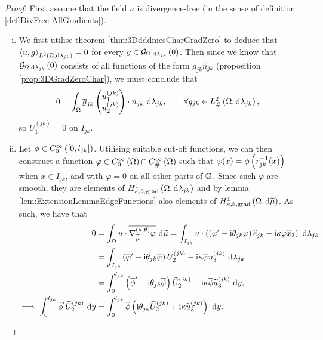 \begin{proof}
	First assume that the field $u$ is divergence-free (in the sense of definition \ref{def:DivFree-AllGradients}).
	\begin{enumerate}[(i)]
		\item We first utilise theorem \ref{thm:3DdddmesCharGradZero} to deduce that $\left\langle u , g \right\rangle_{L^{2}\left( \Omega,\mathrm{d} \lambda_{jk} \right)}=0$ for every $g\in\mathcal{G}_{ \Omega, \mathrm{d}\lambda_{jk}}\left( 0 \right)$.
		Then since we know that $\mathcal{G}_{ \Omega, \mathrm{d}\lambda_{jk}}\left( 0 \right)$ consists of all functions of the form $g_{jk}\hat{n}_{jk}$ (proposition \ref{prop:3DGradZeroChar}), we must conclude that
		\begin{align*}
			0 &= \int_{\Omega} \overline{g}_{jk}\begin{pmatrix} u_1^{(jk)} \\ u_2^{(jk)} \end{pmatrix}\cdot n_{jk}  \ \mathrm{d}\lambda_{jk}, \qquad \forall g_{jk}\in L^2_{\#}\left( \Omega,\mathrm{d} \lambda_{jk} \right),
		\end{align*}
		so $U_1^{(jk)}=0$ on $I_{jk}$.
		\item Let $\phi\in C^{\infty}_{0}\left( \left[ 0,l_{jk} \right] \right)$.
		Utilising suitable cut-off functions, we can then construct a function $\varphi\in C^{\infty}_{0}\left( \Omega \right)\cap C^{\infty}_{\#}\left( \Omega \right)$ such that $\varphi(x)=\phi\left( r_{jk}^{-1}(x) \right)$ when $x\in I_{jk}$, and with $\varphi=0$ on all other parts of $\mathbb{G}$.
		Since such $\varphi$ are smooth, they are elements of $H^1_{\kappa,\theta,\mathrm{grad}}\left( \Omega, \mathrm{d}\lambda_{jk} \right)$ and by lemma \ref{lem:ExtensionLemmaEdgeFunctions} also elements of $H^1_{\kappa,\theta,\mathrm{grad}}\left( \Omega, \mathrm{d}\widetilde{\mu} \right)$.
		As such, we have that
		\begin{align*}
			0 &= \int_{\Omega} u\cdot\overline{\nabla^{\left( \kappa, \theta \right)}_{\widetilde{\mu}}\varphi}  \ \mathrm{d}\widetilde{\mu}
			= \int_{I_{jk}} u\cdot\left(  \left( \overline{\varphi}' - \mathrm{i}\theta_{jk}\overline{\varphi} \right)\widehat{e}_{jk} - \mathrm{i}\kappa\overline{\varphi}\widehat{x}_3 \right)  \ \mathrm{d}\lambda_{jk} \\
			&= \int_{I_{jk}} \left( \overline{\varphi}' - \mathrm{i}\theta_{jk}\overline{\varphi} \right)U_2^{(jk)} - \mathrm{i}\kappa\overline{\varphi}u_3^{(jk)}  \ \mathrm{d}\lambda_{jk} \\
			&= \int_0^{l_{jk}} \left( \overline{\phi}' - \mathrm{i}\theta_{jk}\overline{\phi} \right)\widetilde{U}_2^{(jk)} - \mathrm{i}\kappa\overline{\phi}\widetilde{u}_3^{(jk)} \ \mathrm{d} y, \\
			\implies
			\int_0^{l_{jk}} \overline{\phi}'\widetilde{U}_2^{(jk)} \ \mathrm{d} y
			&= \int_0^{l_{jk}} \overline{\phi}\left(  \mathrm{i}\theta_{jk}\widetilde{U}_2^{(jk)} + \mathrm{i}\kappa\widetilde{u}_3^{(jk)}  \right) \ \mathrm{d} y.
		\end{align*}

\end{enumerate}
\end{proof}

